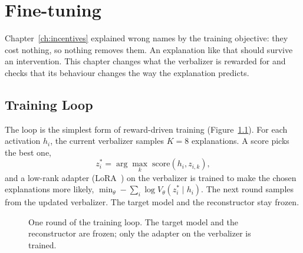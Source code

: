 \chapter{Fine-tuning}
\label{ch:finetuning}

Chapter~\ref{ch:incentives} explained wrong names by the training objective: they cost nothing, so nothing
removes them. An explanation like that should survive an intervention. This chapter changes what the
verbalizer is rewarded for and checks that its behaviour changes the way the explanation predicts.

\section{Training Loop}

The loop is the simplest form of reward-driven training (Figure~\ref{fig:loop}). For each activation $h_i$, the current verbalizer
samples $K=8$ explanations. A score picks the best one,
\begin{equation}
z_i^{*} = \arg\max_{k}\; \mathrm{score}(h_i, z_{i,k}),
\end{equation}
and a low-rank adapter (LoRA~\cite{hu2022lora}) on the verbalizer is trained to make the chosen explanations
more likely, $\min_\theta -\sum_i \log V_\theta(z_i^{*} \mid h_i)$. The next round samples from the updated
verbalizer. The target model and the reconstructor stay frozen.

\begin{figure}[t]
\centering
{}
\caption[One round of the training loop]{One round of the training loop. The target model and the
reconstructor are frozen; only the adapter on the verbalizer is trained.}
\label{fig:loop}
\end{figure}

